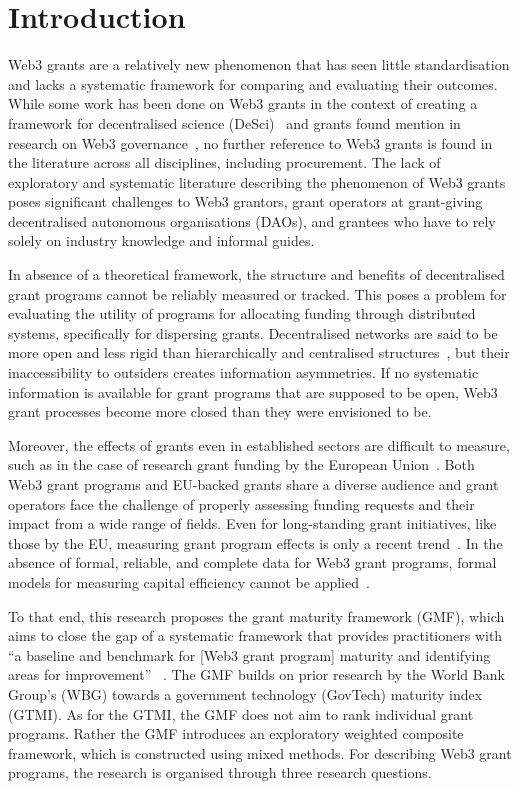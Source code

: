 \documentclass[conference]{IEEEtran}
\begin{document}
\section{Introduction}\label{sec_1}
Web3 grants are a relatively new phenomenon that has seen little standardisation and lacks a systematic framework for comparing and evaluating their outcomes. While some work has been done on Web3 grants in the context of creating a framework for decentralised science (DeSci)~\cite{ding_desci_2022} and grants found mention in research on Web3 governance~\cite{allen_exchange_2022}, no further reference to Web3 grants is found in the literature across all disciplines, including procurement. The lack of exploratory and systematic literature describing the phenomenon of Web3 grants poses significant challenges to Web3 grantors, grant operators at grant-giving decentralised autonomous organisations (DAOs), and grantees who have to rely solely on industry knowledge and informal guides.

In absence of a theoretical framework, the structure and benefits of decentralised grant programs cannot be reliably measured or tracked. This poses a problem for evaluating the utility of programs for allocating funding through distributed systems, specifically for dispersing grants. Decentralised networks are said to be more open and less rigid than hierarchically and centralised structures~\cite{ding_desci_2022}, but their inaccessibility to outsiders creates information asymmetries. If no systematic information is available for grant programs that are supposed to be open, Web3 grant processes become more closed than they were envisioned to be.

Moreover, the effects of grants even in established sectors are difficult to measure, such as in the case of research grant funding by the European Union~\cite{selebaj_effects_2021}. Both Web3 grant programs and EU-backed grants share a diverse audience and grant operators face the challenge of properly assessing funding requests and their impact from a wide range of fields. Even for long-standing grant initiatives, like those by the EU, measuring grant program effects is only a recent trend~\cite{selebaj_effects_2021}. In the absence of formal, reliable, and complete data for Web3 grant programs, formal models for measuring capital efficiency cannot be applied~\cite{ odewole_capital_2020}.

To that end, this research proposes the grant maturity framework (GMF), which aims to close the gap of a systematic framework that provides practitioners with ``a baseline and benchmark for [Web3 grant program] maturity and identifying areas for improvement''~ \cite{dener_govtech_2021}. The GMF builds on prior research by the World Bank Group’s (WBG) towards a government technology (GovTech) maturity index (GTMI). As for the GTMI, the GMF does not aim to rank individual grant programs. Rather the GMF introduces an exploratory weighted composite framework, which is constructed using mixed methods. For describing Web3 grant programs, the research is organised through three research questions.
\end{document}
